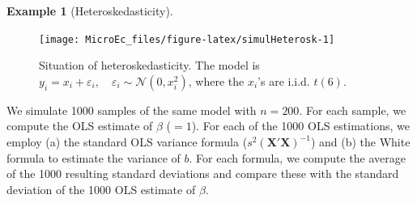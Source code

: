 \documentclass[
  12pt,
]{book}
\theoremstyle{definition}
\theoremstyle{definition}
\newtheorem{example}{Example}[chapter]
\theoremstyle{definition}
\theoremstyle{definition}
\theoremstyle{remark}
\begin{document}
\begin{example}[Heteroskedasticity]
\begin{figure}
\texttt{[image: MicroEc\_files/figure-latex/simulHeterosk-1]} \caption{Situation of heteroskedasticity. The model is $y_i = x_i + \varepsilon_i, \quad \varepsilon_i \sim \mathcal{N}(0,x_i^2)$, where the $x_i$'s are i.i.d. $t(6)$.}\label{fig:simulHeterosk}
\end{figure}

We simulate 1000 samples of the same model with \(n=200\). For each sample, we compute the OLS estimate of \(\beta\) (\(=1\)). For each of the 1000 OLS estimations, we employ (a) the standard OLS variance formula (\(s^2 (\mathbf{X}'\mathbf{X})^{-1}\)) and (b) the White formula to estimate the variance of \(b\). For each formula, we compute the average of the 1000 resulting standard deviations and compare these with the standard deviation of the 1000 OLS estimate of \(\beta\).


\end{example}
\end{document}

